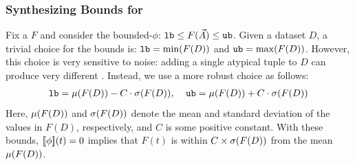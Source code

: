 \subsubsection{Synthesizing Bounds for \Views}\label{synth-bounds} Fix a \view $F$
and consider the bounded-\view \invariant $\phi$: ${\mathtt{lb}} \leq
F(\vec{A}) \leq {\mathtt{ub}}$. 
Given a dataset $D$, a trivial choice for the bounds
is: ${\mathtt{lb}} = \min(F(D))$ and ${\mathtt{ub}} = \max(F(D))$. However, this choice is very
sensitive to noise: adding a single atypical tuple to $D$ can produce very
different \invariants.
%
Instead, we use a more robust choice as follows:
%
\begin{align*}
    {\mathtt{lb}} = {\mathtt{\mu}}(F(D)) - C \cdot {\mathtt{\sigma}}(F(D)), \;\;\;\;
    {\mathtt{ub}} = {\mathtt{\mu}}(F(D)) + C \cdot {\mathtt{\sigma}}(F(D))
\end{align*}
%
Here, ${\mathtt{\mu}}(F(D))$ and ${\mathtt{\sigma}}(F(D))$ denote the mean and standard deviation
of the values in $F(D)$, respectively, and $C$ is some positive constant.
With these bounds, ${[\![{\phi}]\!]}(t) = 0$ implies that
        $F(t)$ is within $C \times {\mathtt{\sigma}}(F(D))$ from the mean ${\mathtt{\mu}}(F(D))$. %
%
%
%

